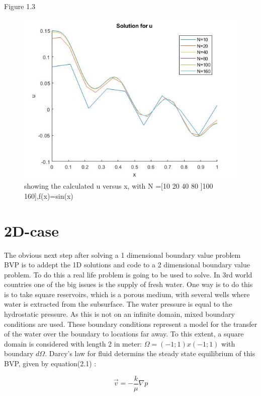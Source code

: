 \documentclass[a4paper]{report}
\begin{document}
\newpage

Figure 1.3

\begin{figure}[ht!]
	\centering
	\includegraphics[width=150mm]{1Dfsinx.jpg}
	\caption{showing the calculated u versus x, with N =[10 20 40 80 ]100 160],f(x)=sin(x) \label{overflow}}
\end{figure}


\chapter{2D-case}


The obvious next step after solving a 1 dimensional boundary value problem BVP is to addept the 1D solutions and code to a 2 dimensional boundary value problem. To do this a real life problem is going to be used to solve. In 3rd world countries one of the big issues is the supply of fresh water. One way is to do this is to take square reservoirs, which is a porous medium, with several wells where water is extracted from the subsurface. The water pressure is equal to the hydrostatic pressure. As this is not on an infinite domain, mixed boundary conditions are used. These boundary conditions represent a model for the transfer of the water over the boundary to locations far away. To this extent, a square domain is considered with length 2 in meter: $\Omega= (-1; 1) x (-1; 1)$ with boundary $d\Omega$. Darcy's law for fluid determins the steady state equilibrium of this BVP, given by equation(2.1) :

\begin{equation}
\vec{v}=-\frac{k}{\mu}\nabla p
\end{equation}
\medskip
\end{document}
